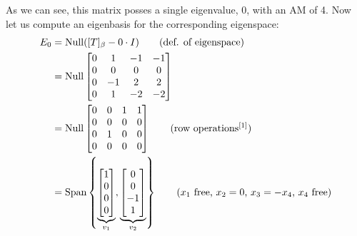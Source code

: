 \documentclass{article}
\begin{document}
As we can see, this matrix posses a single eigenvalue, 0, with an AM of 4. Now let us compute an eigenbasis for the corresponding eigenspace:
\begin{align*}
  E_0&=\operatorname{Null}([T]_\beta-0\cdot I)\tag{def. of eigenspace}\\
  &=\operatorname{Null}\begin{bmatrix}
    0&1&-1&-1\\0&0&0&0\\0&-1&2&2\\0&1&-2&-2
  \end{bmatrix}\\
  &=\operatorname{Null}\begin{bmatrix}
    0&0&1&1\\0&0&0&0\\0&1&0&0\\0&0&0&0
  \end{bmatrix}\tag{row $\text{operations}^{[1]}$}\\
  &=\text{Span}\left\{\underbrace{\begin{bmatrix} 1\\0\\0\\0\end{bmatrix}}_{v_1},\underbrace{\begin{bmatrix} 0\\0\\-1\\1\end{bmatrix}}_{v_2}\right\}\tag{$x_1$ free, $x_2=0$, $x_3=-x_4$, $x_4$ free}
\end{align*}
\end{document}
